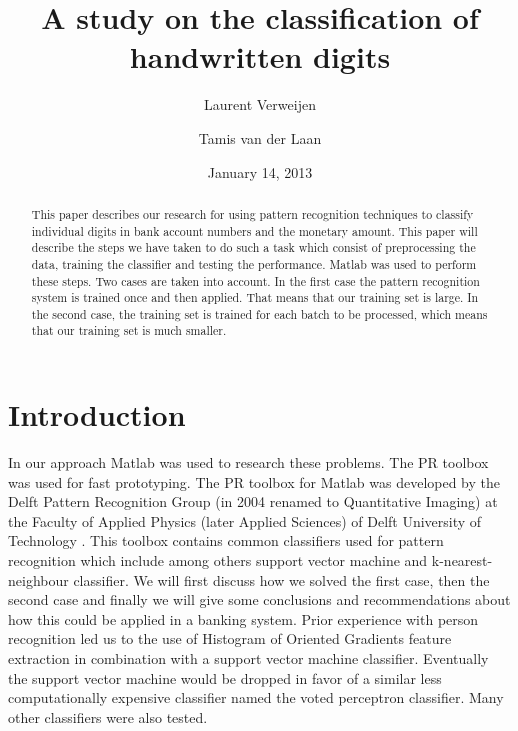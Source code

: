\documentclass[%
        compressed,
        final,
        notitlepage,
        narroweqnarray,
        inline,
        twoside,
        ]{ieee}
\title{A study on the classification of handwritten digits}
\author{Laurent Verweijen \and Tamis van der Laan}
\date{January 14, 2013}
\begin{document}
\maketitle

\begin{abstract}
    This paper describes our research for using pattern recognition techniques
    to classify individual digits in bank account numbers and the monetary
    amount. This paper will describe the steps we have taken to do such a task
    which consist of preprocessing the data, training the classifier and testing
    the performance. Matlab was used to perform these steps. Two cases are taken
    into account. In the first case the pattern recognition system is trained
    once and then applied. That means that our training set is large. In the
    second case, the training set is trained for each batch to be processed,
    which means that our training set is much smaller.
\end{abstract}

\section{Introduction}

In our approach Matlab was used to research these problems. The PR toolbox was
used for fast prototyping. The PR toolbox for Matlab was developed by the Delft
Pattern Recognition Group (in 2004 renamed to Quantitative Imaging) at the
Faculty of Applied Physics (later Applied Sciences) of Delft University of
Technology \cite{Ferdi}.
This toolbox contains common classifiers used for pattern recognition which
include among others support vector machine and k-nearest-neighbour classifier. We will first
discuss how we solved the first case, then the second case and finally we will
give some conclusions and recommendations about how this could be applied in a
banking system. Prior experience with person recognition \cite{Tamis} led us to
the use of Histogram of Oriented Gradients feature
extraction in combination with a support vector machine classifier. Eventually
the support vector machine would be dropped in favor of a similar less
computationally expensive classifier named the voted perceptron classifier. Many
other classifiers were also tested.
\end{document}
